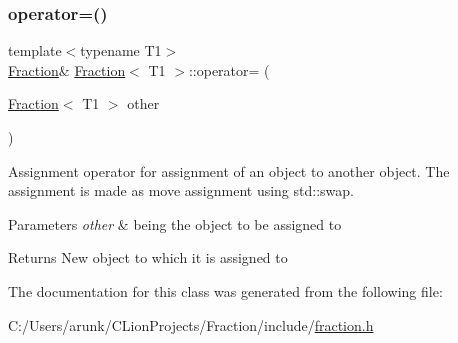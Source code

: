 \subsubsection{\texorpdfstring{operator=()}{operator=()}}
{\footnotesize\ttfamily template$<$typename T1$>$ \\
\mbox{\hyperlink{class_fraction}{Fraction}}\& \mbox{\hyperlink{class_fraction}{Fraction}}$<$ T1 $>$\+::operator= (\begin{DoxyParamCaption}\item[{\mbox{\hyperlink{class_fraction}{Fraction}}$<$ T1 $>$}]{other }\end{DoxyParamCaption})}



Assignment operator for assignment of an object to another object. The assignment is made as move assignment using std\+::swap. 


\begin{DoxyParams}{Parameters}
{\em other} & being the object to be assigned to \\
\hline
\end{DoxyParams}
\begin{DoxyReturn}{Returns}
New object to which it is assigned to 
\end{DoxyReturn}


The documentation for this class was generated from the following file\+:\begin{DoxyCompactItemize}
\item 
C\+:/\+Users/arunk/\+C\+Lion\+Projects/\+Fraction/include/\mbox{\hyperlink{fraction_8h}{fraction.\+h}}\end{DoxyCompactItemize}
